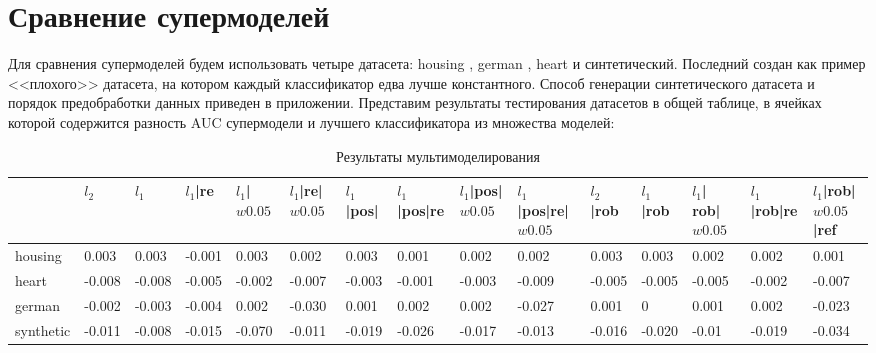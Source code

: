 \documentclass[12pt,twoside]{article}
\theoremstyle{plain}
\theoremstyle{remark}
\theoremstyle{definition}
\begin{document}
\section{Сравнение супермоделей}

Для сравнения супермоделей будем использовать четыре датасета: housing \cite{UCI:Housing}, german \cite{UCI:German}, heart \cite{UCI:Heart} и синтетический.  Последний создан как пример <<плохого>> датасета, на котором каждый классификатор едва лучше константного. Способ генерации синтетического датасета и порядок предобработки данных приведен в приложении. Представим результаты тестирования датасетов в общей таблице, в ячейках которой содержится разность AUC супермодели и лучшего классификатора из множества моделей:

\newpage

\begin{table}
\centering
\caption{Результаты мультимоделирования}
\scriptsize
\begin{tabular}{|l|l|l|l|l|l|l|l|l|l|l|l|l|l|l|}
\hline
          & $l_2$  & $l_1$  & $l_1$|re & $l_1$| $w0.05$ & $l_1$|re|$w0.05$ & $l_1$|pos| & $l_1$|pos|re & $l_1$|pos|$w0.05$ & $l_1$|pos|re|$w0.05$ & $l_2$|rob & $l_1$|rob & $l_1$| rob|$w0.05$ & $l_1$|rob|re & $l_1$|rob|$w0.05$|ref \\ \hline
housing   & 0.003  & 0.003  & -0.001   & 0.003          & 0.002            & 0.003      & 0.001        & 0.002             & 0.002                & 0.003     & 0.003     & 0.002              & 0.002        & 0.001                 \\ \hline
heart     & -0.008 & -0.008 & -0.005   & -0.002         & -0.007           & -0.003     & -0.001       & -0.003            & -0.009               & -0.005    & -0.005    & -0.005             & -0.002       & -0.007                \\ \hline
german    & -0.002 & -0.003 & -0.004   & 0.002          & -0.030           & 0.001      & 0.002        & 0.002             & -0.027               & 0.001     & 0         & 0.001              & 0.002        & -0.023                \\ \hline
synthetic & -0.011 & -0.008 & -0.015   & -0.070         & -0.011           & -0.019     & -0.026       & -0.017            & -0.013               & -0.016    & -0.020    & -0.01              & -0.019       & -0.034                \\ \hline
\end{tabular}
\end{table}
\end{document}
